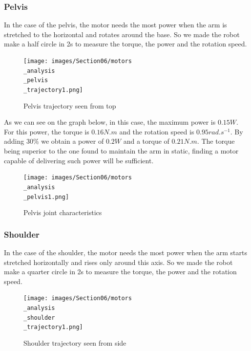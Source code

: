 \subsubsection{Pelvis}

In the case of the pelvis, the motor needs the most power when the arm is stretched to the horizontal and rotates around the base. So we made the robot make a half circle in 2s to measure the torque, the power and the rotation speed.
\begin{figure}[ht]
    \centering
    \texttt{[image: images/Section06/motors\\\_analysis\\\_pelvis\\\_trajectory1.png]}
    \caption{Pelvis trajectory seen from top}
    \label{fig:mesh15}
\end{figure}
\FloatBarrier

\bigbreak
As we can see on the graph below, in this case, the maximum power is $0.15W$. For this power, the torque is $0.16N.m$ and the rotation speed is $0.95rad.s^{-1}$. By adding 30\% we obtain a power of $0.2W$ and a torque of $0.21N.m$. The torque being superior to the one found to maintain the arm in static, finding a motor capable of delivering such power will be sufficient.
\begin{figure}[ht]
    \centering
    \texttt{[image: images/Section06/motors\\\_analysis\\\_pelvis1.png]}
    \caption{Pelvis joint characteristics}
    \label{fig:mesh15}
\end{figure}
\FloatBarrier

\subsubsection{Shoulder}

In the case of the shoulder, the motor needs the most power when the arm starts stretched horizontally and rises only around this axis. So we made the robot make a quarter circle in 2s to measure the torque, the power and the rotation speed.
\begin{figure}[ht]
    \centering
    \texttt{[image: images/Section06/motors\\\_analysis\\\_shoulder\\\_trajectory1.png]}
    \caption{Shoulder trajectory seen from side}
    \label{fig:mesh15}
\end{figure}
\FloatBarrier

